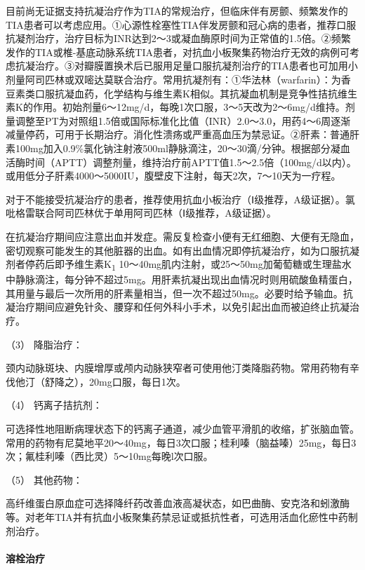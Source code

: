 目前尚无证据支持抗凝治疗作为TIA的常规治疗，但临床伴有房颤、频繁发作的TIA患者可以考虑应用。①心源性栓塞性TIA伴发房颤和冠心病的患者，推荐口服抗凝剂治疗，治疗目标为INR达到2～3或凝血酶原时间为正常值的1.5倍。②频繁发作的TIA或椎-基底动脉系统TIA患者，对抗血小板聚集药物治疗无效的病例可考虑抗凝治疗。③对瓣膜置换术后已服用足量口服抗凝剂治疗的TIA患者也可加用小剂量阿司匹林或双嘧达莫联合治疗。常用抗凝剂有：①华法林（warfarin）：为香豆素类口服抗凝血药，化学结构与维生素K相似。其抗凝血机制是竞争性拮抗维生素K的作用。初始剂量6～12mg/d，每晚1次口服，3～5天改为2～6mg/d维持。剂量调整至PT为对照组1.5倍或国际标准化比值（INR）2.0～3.0，用药4～6周逐渐减量停药，可用于长期治疗。消化性溃疡或严重高血压为禁忌证。②肝素：普通肝素100mg加入0.9\%氯化钠注射液500ml静脉滴注，20～30滴/分钟。根据部分凝血活酶时间（APTT）调整剂量，维持治疗前APTT值1.5～2.5倍（100mg/d以内）。或用低分子肝素4000～5000IU，腹壁皮下注射，每天2次，7～10天为一疗程。

对于不能接受抗凝治疗的患者，推荐使用抗血小板治疗（Ⅰ级推荐，A级证据）。氯吡格雷联合阿司匹林优于单用阿司匹林（Ⅰ级推荐，A级证据）。

在抗凝治疗期间应注意出血并发症。需反复检查小便有无红细胞、大便有无隐血，密切观察可能发生的其他脏器的出血。如有出血情况即停抗凝治疗，如为口服抗凝剂者停药后即予维生素K\textsubscript{1}
10～40mg肌内注射，或25～50mg加葡萄糖或生理盐水中静脉滴注，每分钟不超过5mg。用肝素抗凝出现出血情况时则用硫酸鱼精蛋白，其用量与最后一次所用的肝素量相当，但一次不超过50mg。必要时给予输血。抗凝治疗期间应避免针灸、腰穿和任何外科小手术，以免引起出血而被迫终止抗凝治疗。

\hypertarget{text00241.htmlux5cux23CHP8-1-1-3-2-3}{}
（3） 降脂治疗：

颈内动脉斑块、内膜增厚或颅内动脉狭窄者可使用他汀类降脂药物。常用药物有辛伐他汀（舒降之），20mg口服，每日1次。

\hypertarget{text00241.htmlux5cux23CHP8-1-1-3-2-4}{}
（4） 钙离子拮抗剂：

可选择性地阻断病理状态下的钙离子通道，减少血管平滑肌的收缩，扩张脑血管。常用的药物有尼莫地平20～40mg，每日3次口服；桂利嗪（脑益嗪）25mg，每日3次；氟桂利嗪（西比灵）5～10mg每晚l次口服。

\hypertarget{text00241.htmlux5cux23CHP8-1-1-3-2-5}{}
（5） 其他药物：

高纤维蛋白原血症可选择降纤药改善血液高凝状态，如巴曲酶、安克洛和蚓激酶等。对老年TIA并有抗血小板聚集药禁忌证或抵抗性者，可选用活血化瘀性中药制剂治疗。

\paragraph{溶栓治疗}

